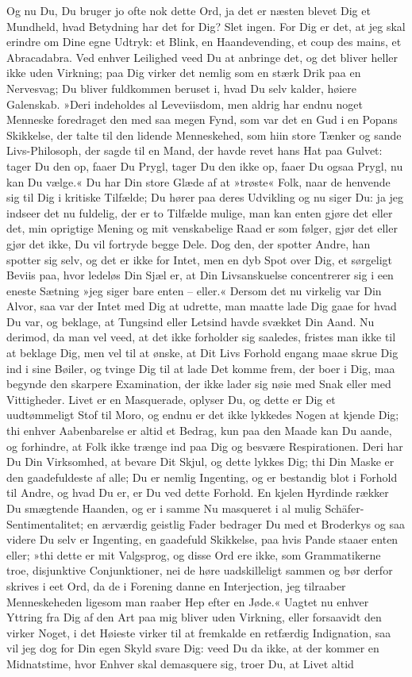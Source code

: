 \documentclass[12pt,a4paper]{article}
\begin{document}
Og nu Du, Du bruger jo ofte nok dette Ord, ja det er næsten blevet Dig et Mundheld, hvad Betydning har det for Dig? Slet ingen. For Dig er det, at jeg skal erindre om Dine egne Udtryk: et Blink, en Haandevending, et coup des mains, et Abracadabra. Ved enhver Leilighed veed Du at anbringe det, og det bliver heller ikke uden Virkning; paa Dig virker det nemlig som en stærk Drik paa en Nervesvag; Du bliver fuldkommen beruset i, hvad Du selv kalder, høiere Galenskab. »Deri indeholdes al Leveviisdom, men aldrig har endnu noget Menneske foredraget den med saa megen Fynd, som var det en Gud i en Popans Skikkelse, der talte til den lidende Menneskehed, som hiin store Tænker og sande Livs-Philosoph, der sagde til en Mand, der havde revet hans Hat paa Gulvet: tager Du den op, faaer Du Prygl, tager Du den ikke op, faaer Du ogsaa Prygl, nu kan Du vælge.« Du har Din store Glæde af at »trøste« Folk, naar de henvende sig til Dig i kritiske Tilfælde; Du hører paa deres Udvikling og nu siger Du: ja jeg indseer det nu fuldelig, der er to Tilfælde mulige, man kan enten gjøre det eller det, min oprigtige Mening og mit venskabelige Raad er som følger, gjør det eller gjør det ikke, Du vil fortryde begge Dele. Dog den, der spotter Andre, han spotter sig selv, og det er ikke for Intet, men en dyb Spot over Dig, et sørgeligt Beviis paa, hvor ledeløs Din Sjæl er, at Din Livsanskuelse concentrerer sig i een eneste Sætning »jeg siger bare enten – eller.« Dersom det nu virkelig var Din Alvor, saa var der Intet med Dig at udrette, man maatte lade Dig gaae for hvad Du var, og beklage, at Tungsind eller Letsind havde svækket Din Aand. Nu derimod, da man vel veed, at det ikke forholder sig saaledes, fristes man ikke til at beklage Dig, men vel til at ønske, at Dit Livs Forhold engang maae skrue Dig ind i sine Bøiler, og tvinge Dig til at lade Det komme frem, der boer i Dig, maa begynde den skarpere Examination, der ikke lader sig nøie med Snak eller med Vittigheder. Livet er en Masquerade, oplyser Du, og dette er Dig et uudtømmeligt Stof til Moro, og endnu er det ikke lykkedes Nogen at kjende Dig; thi enhver Aabenbarelse er altid et Bedrag, kun paa den Maade kan Du aande, og forhindre, at Folk ikke trænge ind paa Dig og besvære Respirationen. Deri har Du Din Virksomhed, at bevare Dit Skjul, og dette lykkes Dig; thi Din Maske er den gaadefuldeste af alle; Du er nemlig Ingenting, og er bestandig blot i Forhold til Andre, og hvad Du er, er Du ved dette Forhold. En kjelen Hyrdinde rækker Du smægtende Haanden, og er i samme Nu masqueret i al mulig Schäfer-Sentimentalitet; en ærværdig geistlig Fader bedrager Du med et Broderkys og saa videre Du selv er Ingenting, en gaadefuld Skikkelse, paa hvis Pande staaer enten eller; »thi dette er mit Valgsprog, og disse Ord ere ikke, som Grammatikerne troe, disjunktive Conjunktioner, nei de høre uadskilleligt sammen og bør derfor skrives i eet Ord, da de i Forening danne en Interjection, jeg tilraaber Menneskeheden ligesom man raaber Hep efter en Jøde.« Uagtet nu enhver Yttring fra Dig af den Art paa mig bliver uden Virkning, eller forsaavidt den virker Noget, i det Høieste virker til at fremkalde en retfærdig Indignation, saa vil jeg dog for Din egen Skyld svare Dig: veed Du da ikke, at der kommer en Midnatstime, hvor Enhver skal demasquere sig, troer Du, at Livet altid 
\end{document}
